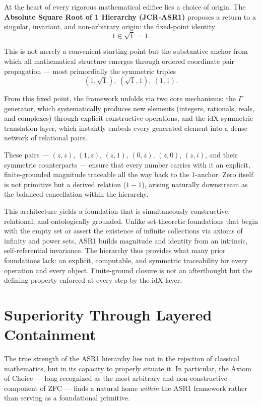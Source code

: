 \documentclass[11pt,a4paper]{article}
\begin{document}
At the heart of every rigorous mathematical edifice lies a choice of origin. The \textbf{Absolute Square Root of 1 Hierarchy (JCR-ASR1)} proposes a return to a singular, invariant, and non-arbitrary origin: the fixed-point identity 
\[
1 \in \sqrt{1} = 1.
\]

This is not merely a convenient starting point but the substantive anchor from which all mathematical structure emerges through ordered coordinate pair propagation --- most primordially the symmetric triples 
\[
(1, \sqrt{1}),\ (\sqrt{1}, 1),\ (1, 1).
\]

From this fixed point, the framework unfolds via two core mechanisms: the $\Gamma$ generator, which systematically produces new elements (integers, rationals, reals, and complexes) through explicit constructive operations, and the $\mathrm{idX}$ symmetric translation layer, which instantly embeds every generated element into a dense network of relational pairs. 

These pairs --- $(z, z)$, $(1, z)$, $(z, 1)$, $(0, z)$, $(z, 0)$, $(z, i)$, and their symmetric counterparts --- ensure that every number carries with it an explicit, finite-grounded magnitude traceable all the way back to the 1-anchor. Zero itself is not primitive but a derived relation ($1 - 1$), arising naturally downstream as the balanced cancellation within the hierarchy.

This architecture yields a foundation that is simultaneously constructive, relational, and ontologically grounded. Unlike set-theoretic foundations that begin with the empty set or assert the existence of infinite collections via axioms of infinity and power sets, ASR1 builds magnitude and identity from an intrinsic, self-referential invariance. The hierarchy thus provides what many prior foundations lack: an explicit, computable, and symmetric traceability for every operation and every object. Finite-ground closure is not an afterthought but the defining property enforced at every step by the $\mathrm{idX}$ layer.

\section*{Superiority Through Layered Containment}

The true strength of the ASR1 hierarchy lies not in the rejection of classical mathematics, but in its capacity to properly situate it. In particular, the Axiom of Choice --- long recognized as the most arbitrary and non-constructive component of ZFC --- finds a natural home \emph{within} the ASR1 framework rather than serving as a foundational primitive.
\end{document}
